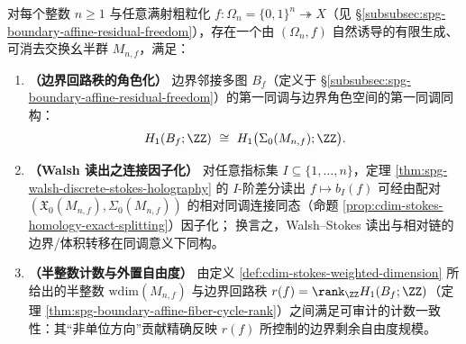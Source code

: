 
\begin{conjecture}\label{conj:cdim-walsh-stokes-unified-homology}
对每个整数 \(n\ge 1\) 与任意满射粗粒化 \(f:\Omega_n=\{0,1\}^n\twoheadrightarrow X\)（见 \S\ref{subsubsec:spg-boundary-affine-residual-freedom}），存在一个由 \((\Omega_n,f)\) 自然诱导的有限生成、可消去交换幺半群 \(M_{n,f}\)，满足：
\begin{enumerate}
  \item \textbf{（边界回路秩的角色化）}
  边界邻接多图 \(B_f\)（定义于 \S\ref{subsubsec:spg-boundary-affine-residual-freedom}）的第一同调与边界角色空间的第一同调同构：
  \[
  H_1(B_f;\ZZ)\ \cong\ H_1\bigl(\Sigma_0(M_{n,f});\ZZ\bigr).
  \]
  \item \textbf{（Walsh 读出之连接因子化）}
  对任意指标集 \(I\subseteq\{1,\dots,n\}\)，定理 \ref{thm:spg-walsh-discrete-stokes-holography} 的 \(I\)-阶差分读出
  \(
  f\mapsto b_I(f)
  \)
  可经由配对 \((\mathfrak X_0(M_{n,f}),\Sigma_0(M_{n,f}))\) 的相对同调连接同态（命题 \ref{prop:cdim-stokes-homology-exact-splitting}）因子化；
  换言之，Walsh--Stokes 读出与相对链的边界/体积转移在同调意义下同构。
  \item \textbf{（半整数计数与外置自由度）}
  由定义 \ref{def:cdim-stokes-weighted-dimension} 所给出的半整数 \(\mathrm{wdim}(M_{n,f})\) 与边界回路秩 \(r(f)=\rank_{\ZZ}H_1(B_f;\ZZ)\)（定理 \ref{thm:spg-boundary-affine-fiber-cycle-rank}）之间满足可审计的计数一致性：其“非单位方向”贡献精确反映 \(r(f)\) 所控制的边界剩余自由度规模。
\end{enumerate}
\end{conjecture}

\endinput
